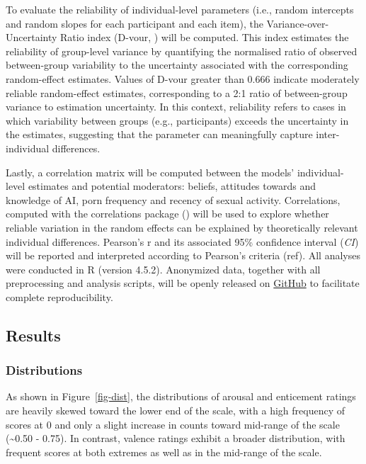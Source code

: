 \documentclass[
  jou,
  floatsintext,
  longtable,
  nolmodern,
  notxfonts,
  notimes,
  colorlinks=true,linkcolor=blue,citecolor=blue,urlcolor=blue]{apa7}
\begin{document}
To evaluate the reliability of individual-level parameters (i.e., random
intercepts and random slopes for each participant and each item), the
Variance-over-Uncertainty Ratio index (D-vour,
) will be
computed. This index estimates the reliability of group-level variance
by quantifying the normalised ratio of observed between-group
variability to the uncertainty associated with the corresponding
random-effect estimates. Values of D-vour greater than 0.666 indicate
moderately reliable random-effect estimates, corresponding to a 2:1
ratio of between-group variance to estimation uncertainty. In this
context, reliability refers to cases in which variability between groups
(e.g., participants) exceeds the uncertainty in the estimates,
suggesting that the parameter can meaningfully capture inter-individual
differences.

Lastly, a correlation matrix will be computed between the models'
individual-level estimates and potential moderators: beliefs, attitudes
towards and knowledge of AI, porn frequency and recency of sexual
activity. Correlations, computed with the correlations package
() will be used
to explore whether reliable variation in the random effects can be
explained by theoretically relevant individual differences. Pearson's r
and its associated 95\% confidence interval (\emph{CI}) will be reported
and interpreted according to Pearson's criteria (ref). All analyses were
conducted in R (version 4.5.2). Anonymized data, together with all
preprocessing and analysis scripts, will be openly released on
\href{https://github.com/RealityBending/FictionEro}{GitHub} to
facilitate complete reproducibility.

\subsection{Results}\label{results}

\subsubsection{Distributions}\label{distributions}

As shown in Figure~\ref{fig-dist}, the distributions of arousal and
enticement ratings are heavily skewed toward the lower end of the scale,
with a high frequency of scores at 0 and only a slight increase in
counts toward mid-range of the scale (\textasciitilde0.50 - 0.75). In
contrast, valence ratings exhibit a broader distribution, with frequent
scores at both extremes as well as in the mid-range of the scale.
\end{document}
